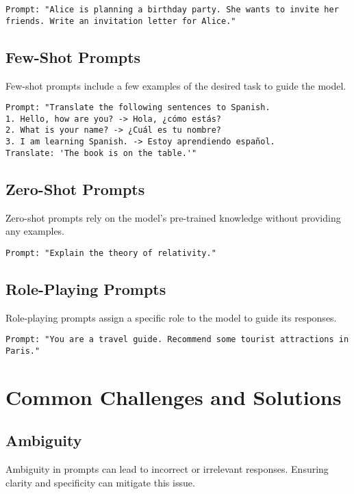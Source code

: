 \begin{verbatim}
Prompt: "Alice is planning a birthday party. She wants to invite her friends. Write an invitation letter for Alice."
\end{verbatim}

\subsection{Few-Shot Prompts}
Few-shot prompts include a few examples of the desired task to guide the model.

\begin{verbatim}
Prompt: "Translate the following sentences to Spanish.
1. Hello, how are you? -> Hola, ¿cómo estás?
2. What is your name? -> ¿Cuál es tu nombre?
3. I am learning Spanish. -> Estoy aprendiendo español.
Translate: 'The book is on the table.'"
\end{verbatim}

\subsection{Zero-Shot Prompts}
Zero-shot prompts rely on the model's pre-trained knowledge without providing any examples.

\begin{verbatim}
Prompt: "Explain the theory of relativity."
\end{verbatim}

\subsection{Role-Playing Prompts}
Role-playing prompts assign a specific role to the model to guide its responses.

\begin{verbatim}
Prompt: "You are a travel guide. Recommend some tourist attractions in Paris."
\end{verbatim}

\section{Common Challenges and Solutions}

\subsection{Ambiguity}
Ambiguity in prompts can lead to incorrect or irrelevant responses. Ensuring clarity and specificity can mitigate this issue.

